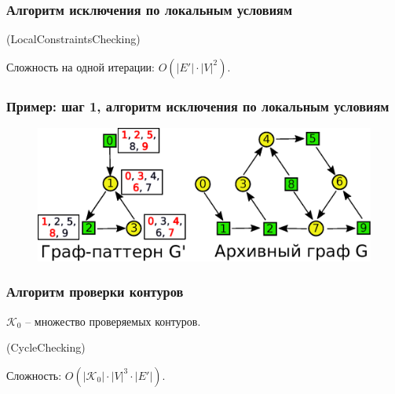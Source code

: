 \documentclass{beamer}
\begin{document}
\begin{frame}
\frametitle{Алгоритм исключения по локальным условиям}
\begin{algorithm}[H]
	\Begin(LocalConstraintsChecking){		
	}
\end{algorithm}

Сложность на одной итерации: $O(|E'|\cdot|V|^2)$.
\end{frame}

\begin{frame}
\frametitle{Пример: шаг 1, алгоритм исключения по локальным условиям}
\begin{figure}[H]
	\centering
	\includegraphics[width=1\textwidth]{ee1}
	\label{fig:ee1}
\end{figure}
\end{frame}

\begin{frame}
\frametitle{Алгоритм проверки контуров}
$\mathcal{K}_0$ -- множество проверяемых контуров.

\begin{algorithm}[H]
	\Begin(CycleChecking){
	}
\end{algorithm}

Сложность: $O(|\mathcal{K}_0| \cdot |V|^3 \cdot |E'|)$.
\end{frame}
\end{document}
